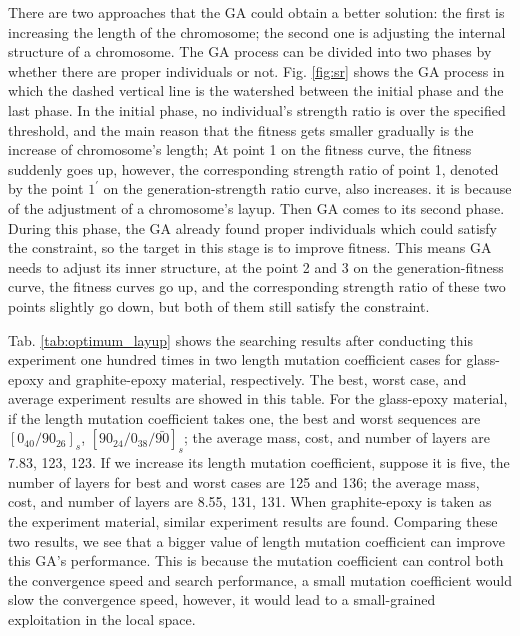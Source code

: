 There are two approaches that the GA could obtain a better solution: the first
is increasing the length of the chromosome; the second one is adjusting the
internal structure of a chromosome. The GA process can be divided into two
phases by whether there are proper individuals or not. Fig.
\ref{fig:sr} shows the GA process in which the dashed vertical line is the
watershed between the initial phase and the last phase. In the initial phase,
no individual's strength ratio is over the specified threshold, and the main
reason that the fitness gets smaller gradually is the increase of chromosome's
length; At point 1 on the fitness curve, the fitness suddenly goes up, however,
the corresponding strength ratio of point 1, denoted by the point $1^{\prime}$
on the generation-strength ratio curve, also increases. it is because of the
adjustment of a chromosome's layup.  Then GA comes to its second phase. During
this phase, the GA already found proper individuals which could satisfy the
constraint, so the target in this stage is to improve fitness. This means GA
needs to adjust its inner structure, at the point 2 and 3 on the
generation-fitness curve, the fitness curves go up, and the corresponding
strength ratio of these two points slightly go down, but both of them still
satisfy the constraint.



Tab. \ref{tab:optimum_layup} shows the searching results after conducting this
experiment one hundred times in two length mutation coefficient cases for
glass-epoxy and graphite-epoxy material, respectively. The best, worst case, and
average experiment results are showed in this table.  For the glass-epoxy
material, if the length mutation coefficient takes one, the best and worst
sequences are $[0_{40}/90_{26}]_s$, $[90_{24}/0_{38}/\bar{90}]_s$; the average mass, cost,
and number of layers are 7.83, 123, 123. If we increase its length mutation
coefficient, suppose it is five, the number of layers for best and worst cases
are 125 and 136;  the average mass, cost, and number of layers are 8.55, 131,
131.  When graphite-epoxy is taken as the experiment material, similar
experiment results are found.  Comparing these two results, we see that a
bigger value of length mutation coefficient can improve this GA's performance.
This is because the mutation coefficient can control both the convergence speed
and search performance, a small mutation coefficient would slow the convergence
speed, however, it would lead to a small-grained exploitation in the local space. 


